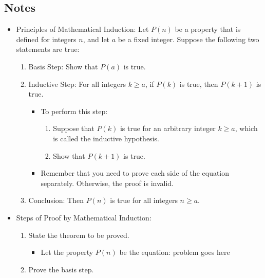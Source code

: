 \documentclass{article}
\begin{document}
    \subsection{Notes}
        \begin{itemize}
            \item Principles of Mathematical Induction: Let $P(n)$ be a property that is defined for integers $n$, and let $a$ be a fixed integer. Suppose the following two statements are true:
                \begin{enumerate}
                    \item Basis Step: Show that $P(a)$ is true.
                    \item Inductive Step: For all integers $k \geq a$, if $P(k)$ is true, then $P(k+1)$ is true.
                        \begin{itemize}
                            \item To perform this step:
                                \begin{enumerate}
                                    \item Suppose that $P(k)$ is true for an arbitrary integer $k \geq a$, which is called the inductive hypothesis.
                                    \item Show that $P(k+1)$ is true.
                                \end{enumerate}
                            \item Remember that you need to prove each side of the equation separately. Otherwise, the proof is invalid.
                        \end{itemize}
                    \item Conclusion: Then $P(n)$ is true for all integers $n \geq a$.
                \end{enumerate}
            \item Steps of Proof by Mathematical Induction:
                \begin{enumerate}
                    \item State the theorem to be proved.
                        \begin{itemize}
                            \item Let the property $P(n)$ be the equation: {problem goes here}
                        \end{itemize}
                    \item Prove the basis step.
                        \begin{itemize}

\end{itemize}
\end{enumerate}
\end{itemize}
\end{document}
